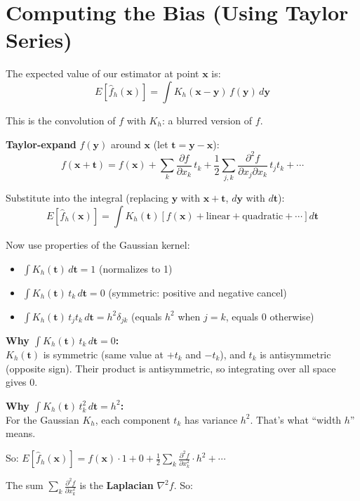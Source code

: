 \documentclass[12pt]{article}
\newcommand{\mathnote}[1]{\begin{tcolorbox}[colback=yellow!5,colframe=yellow!60!black,breakable]#1\end{tcolorbox}}
\begin{document}
\section{Computing the Bias (Using Taylor Series)}

The expected value of our estimator at point $\mathbf{x}$ is:
$$E[\hat{f}_h(\mathbf{x})] = \int K_h(\mathbf{x} - \mathbf{y})\,f(\mathbf{y})\,d\mathbf{y}$$

This is the convolution of $f$ with $K_h$: a blurred version of $f$.

\textbf{Taylor-expand} $f(\mathbf{y})$ around $\mathbf{x}$ (let $\mathbf{t} = \mathbf{y} - \mathbf{x}$):
$$f(\mathbf{x} + \mathbf{t}) = f(\mathbf{x}) + \sum_k \frac{\partial f}{\partial x_k}\,t_k + \frac{1}{2}\sum_{j,k}\frac{\partial^2 f}{\partial x_j\partial x_k}\,t_j t_k + \cdots$$

Substitute into the integral (replacing $\mathbf{y}$ with $\mathbf{x}+\mathbf{t}$, $d\mathbf{y}$ with $d\mathbf{t}$):
$$E[\hat{f}_h(\mathbf{x})] = \int K_h(\mathbf{t})\left[f(\mathbf{x}) + \text{linear} + \text{quadratic} + \cdots\right]d\mathbf{t}$$

Now use properties of the Gaussian kernel:
\begin{itemize}
\item $\int K_h(\mathbf{t})\,d\mathbf{t} = 1$ (normalizes to 1)
\item $\int K_h(\mathbf{t})\,t_k\,d\mathbf{t} = 0$ (symmetric: positive and negative cancel)
\item $\int K_h(\mathbf{t})\,t_j t_k\,d\mathbf{t} = h^2\delta_{jk}$ (equals $h^2$ when $j=k$, equals 0 otherwise)
\end{itemize}

\mathnote{
\textbf{Why $\int K_h(\mathbf{t})\,t_k\,d\mathbf{t} = 0$:}\\
$K_h(\mathbf{t})$ is symmetric (same value at $+t_k$ and $-t_k$), and $t_k$ is antisymmetric (opposite sign). Their product is antisymmetric, so integrating over all space gives 0.

\textbf{Why $\int K_h(\mathbf{t})\,t_k^2\,d\mathbf{t} = h^2$:}\\
For the Gaussian $K_h$, each component $t_k$ has variance $h^2$. That's what ``width $h$'' means.
}

So: $E[\hat{f}_h(\mathbf{x})] = f(\mathbf{x}) \cdot 1 + 0 + \frac{1}{2}\sum_k \frac{\partial^2 f}{\partial x_k^2}\cdot h^2 + \cdots$

The sum $\sum_k \frac{\partial^2 f}{\partial x_k^2}$ is the \textbf{Laplacian} $\nabla^2 f$. So:
\end{document}
